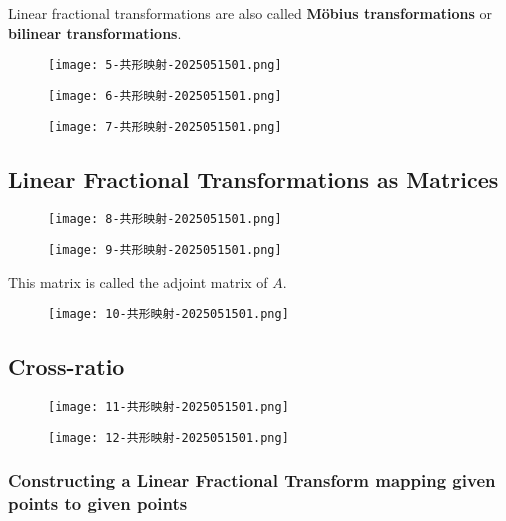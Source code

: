 Linear fractional transformations are also called \textbf{Möbius transformations} or \textbf{bilinear transformations}.
\begin{figure}[H]
\centering
\texttt{[image: 5-共形映射-2025051501.png]}
\label{}
\end{figure}

\begin{figure}[H]
\centering
\texttt{[image: 6-共形映射-2025051501.png]}
\label{}
\end{figure}

\begin{figure}[H]
\centering
\texttt{[image: 7-共形映射-2025051501.png]}
\label{}
\end{figure}

\subsection{Linear Fractional Transformations as Matrices}

\begin{figure}[H]
\centering
\texttt{[image: 8-共形映射-2025051501.png]}
\label{}
\end{figure}
\begin{figure}[H]
\centering
\texttt{[image: 9-共形映射-2025051501.png]}
\label{}
\end{figure}
This matrix is called the adjoint matrix of $A$.

\begin{figure}[H]
\centering
\texttt{[image: 10-共形映射-2025051501.png]}
\label{}
\end{figure}

\subsection{Cross-ratio}

\begin{figure}[H]
\centering
\texttt{[image: 11-共形映射-2025051501.png]}
\label{}
\end{figure}
\begin{figure}[H]
\centering
\texttt{[image: 12-共形映射-2025051501.png]}
\label{}
\end{figure}

\subsubsection{Constructing a Linear Fractional Transform mapping given points to given points}

